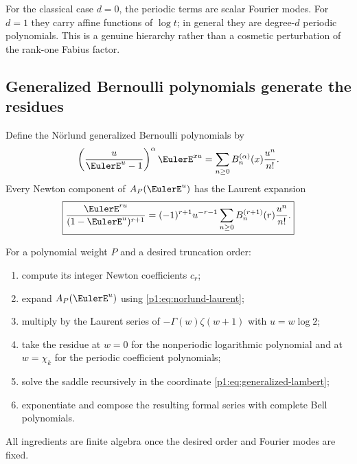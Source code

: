 \documentclass[11pt,oneside]{article}
\numberwithin{equation}{section}
\theoremstyle{definition}
\theoremstyle{remark}
\begin{document}
\begin{remark}
For the classical case $d=0$, the periodic terms are scalar Fourier modes.  For $d=1$ they
carry affine functions of $\log t$; in general they are degree-$d$ periodic polynomials.
This is a genuine hierarchy rather than a cosmetic perturbation of the rank-one Fabius
factor.
\end{remark}

\subsection{Generalized Bernoulli polynomials generate the residues}

Define the N\"orlund generalized Bernoulli polynomials \cite{p1:norlund1924} by
\begin{equation}
 \left(\frac u{\EulerE^u-1}\right)^\alpha\EulerE^{xu}
 =\sum_{n\ge0}B_n^{(\alpha)}(x)\frac{u^n}{n!}.
 \label{p1:eq:norlund-def}
\end{equation}
Every Newton component of $A_P(\EulerE^u)$ has the Laurent expansion
\begin{equation}
 \boxed{
 \frac{\EulerE^{ru}}{(1-\EulerE^u)^{r+1}}
 =(-1)^{r+1}u^{-r-1}
  \sum_{n\ge0}B_n^{(r+1)}(r)\frac{u^n}{n!}.}
 \label{p1:eq:norlund-laurent}
\end{equation}

\begin{algorithm}
\label{p1:alg:bernoulli-bell}
For a polynomial weight $P$ and a desired truncation order:
\begin{enumerate}
\item compute its integer Newton coefficients $c_r$;
\item expand $A_P(\EulerE^u)$ using \eqref{p1:eq:norlund-laurent};
\item multiply by the Laurent series of $-\Gamma(w)\zeta(w+1)$ with $u=w\log2$;
\item take the residue at $w=0$ for the nonperiodic logarithmic polynomial and at
      $w=\chi_k$ for the periodic coefficient polynomials;
\item solve the saddle recursively in the coordinate \eqref{p1:eq:generalized-lambert};
\item exponentiate and compose the resulting formal series with complete Bell polynomials.
\end{enumerate}
All ingredients are finite algebra once the desired order and Fourier modes are fixed.
\end{algorithm}
\end{document}
